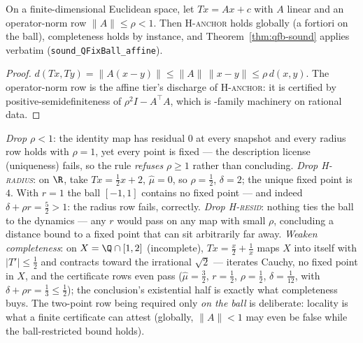 \begin{bprop}\label{prop:qfb-affine}
On a finite-dimensional Euclidean space, let $T x = A x + c$ with $A$
linear and an operator-norm row $\lVert A \rVert \leq \rho < 1$. Then
H-\textsc{anchor} holds globally (a fortiori on the ball), completeness
holds by instance, and Theorem~\ref{thm:qfb-sound} applies verbatim
(\texttt{sound\_QFixBall\_affine}).
\end{bprop}
\begin{proof}
$d(Tx, Ty) = \lVert A(x - y) \rVert \leq \lVert A \rVert\,
\lVert x - y \rVert \leq \rho\, d(x, y)$. The operator-norm row is the
affine tier's discharge of H-\textsc{anchor}: it is certified by
positive-semidefiniteness of $\rho^2 I - A^{\top} A$, which is
-family machinery on rational data.
\end{proof}

\begin{bremark}\label{rem:qfb-omit}
\emph{Drop $\rho < 1$}: the identity map has residual $0$ at every
snapshot and every radius row holds with $\rho = 1$, yet every point is
fixed --- the description license (uniqueness) fails, so the rule
\emph{refuses} $\rho \geq 1$ rather than concluding.
\emph{Drop H-\textsc{radius}}: on $\R$, take $Tx = \tfrac{1}{2}x + 2$,
$\hat\mu = 0$, so $\rho = \tfrac12$, $\delta = 2$; the unique fixed
point is $4$. With $r = 1$ the ball $[-1, 1]$ contains no fixed point
--- and indeed $\delta + \rho r = \tfrac52 > 1$: the radius row fails,
correctly. \emph{Drop H-\textsc{resid}}: nothing ties the ball to the
dynamics --- any $r$ would pass on any map with small $\rho$, concluding
a distance bound to a fixed point that can sit arbitrarily far away.
\emph{Weaken completeness}: on $X = \Q \cap [1, 2]$ (incomplete),
$Tx = \tfrac{x}{2} + \tfrac{1}{x}$ maps $X$ into itself with
$|T'| \le \tfrac12$ and contracts toward the irrational $\sqrt{2}$ ---
iterates Cauchy, no fixed point in $X$, and the certificate rows even
pass ($\hat\mu = \tfrac32$, $r = \tfrac12$, $\rho = \tfrac12$,
$\delta = \tfrac{1}{12}$, with $\delta + \rho r = \tfrac13 \le
\tfrac12$); the conclusion's existential half is exactly what
completeness buys. The two-point row being
required only \emph{on the ball} is deliberate: locality is what a
finite certificate can attest (globally, $\lVert A \rVert < 1$ may even
be false while the ball-restricted bound holds).
\end{bremark}

